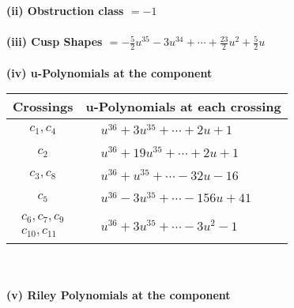 \documentclass[1p]{elsarticle_modified}
\theoremstyle{definition}
\begin{document}
\flushleft \textbf{(ii) Obstruction class $= -1$}\\~\\
\flushleft \textbf{(iii) Cusp Shapes $= -\frac{5}{2} u^{35}-3 u^{34}+\cdots+\frac{23}{2} u^2+\frac{5}{2} u$}\\~\\
\newpage\renewcommand{\arraystretch}{1}
\flushleft \textbf{(iv) u-Polynomials at the component}\newline \\
\begin{tabular}{m{50pt}|m{274pt}}
Crossings & \hspace{64pt}u-Polynomials at each crossing \\
\hline $$\begin{aligned}c_{1},c_{4}\end{aligned}$$&$\begin{aligned}
&u^{36}+3 u^{35}+\cdots+2 u+1
\end{aligned}$\\
\hline $$\begin{aligned}c_{2}\end{aligned}$$&$\begin{aligned}
&u^{36}+19 u^{35}+\cdots+2 u+1
\end{aligned}$\\
\hline $$\begin{aligned}c_{3},c_{8}\end{aligned}$$&$\begin{aligned}
&u^{36}+u^{35}+\cdots-32 u-16
\end{aligned}$\\
\hline $$\begin{aligned}c_{5}\end{aligned}$$&$\begin{aligned}
&u^{36}-3 u^{35}+\cdots-156 u+41
\end{aligned}$\\
\hline $$\begin{aligned}c_{6},c_{7},c_{9}\\c_{10},c_{11}\end{aligned}$$&$\begin{aligned}
&u^{36}+3 u^{35}+\cdots-3 u^2-1
\end{aligned}$\\
\hline
\end{tabular}\\~\\
\newpage\renewcommand{\arraystretch}{1}
\flushleft \textbf{(v) Riley Polynomials at the component}\newline \\
\end{document}
